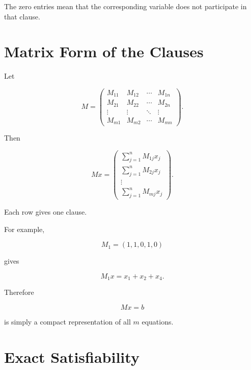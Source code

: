 \documentclass[11pt,a4paper]{article}
\begin{document}
The zero entries mean that the corresponding variable does not
participate in that clause.

\section{Matrix Form of the Clauses}

Let

\begin{equation}
M =
\begin{pmatrix}
M_{11}&M_{12}&\cdots&M_{1n}\\
M_{21}&M_{22}&\cdots&M_{2n}\\
\vdots&\vdots&\ddots&\vdots\\
M_{m1}&M_{m2}&\cdots&M_{mn}
\end{pmatrix}.
\end{equation}

Then

\begin{equation}
Mx =
\begin{pmatrix}
\sum_{j=1}^n M_{1j}x_j\\
\sum_{j=1}^n M_{2j}x_j\\
\vdots\\
\sum_{j=1}^n M_{mj}x_j
\end{pmatrix}.
\end{equation}

Each row gives one clause.

For example,

\begin{equation}
M_1=(1,1,0,1,0)
\end{equation}

gives

\begin{equation}
M_1x=x_1+x_2+x_4.
\end{equation}

Therefore

\begin{equation}
Mx=b
\end{equation}

is simply a compact representation of all $m$ equations.

\section{Exact Satisfiability}
\end{document}
